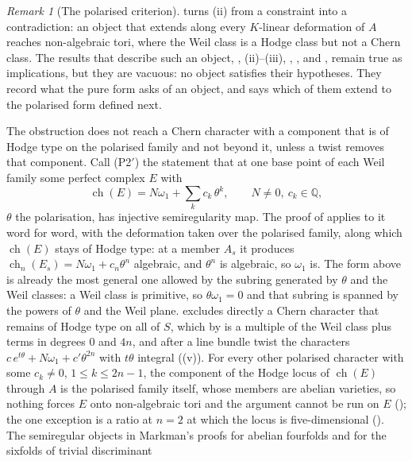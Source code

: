 \documentclass[11pt,reqno]{amsart}
\theoremstyle{plain}
\theoremstyle{definition}
\theoremstyle{remark}
\newtheorem{remark}[theorem]{Remark}
\newcommand{\QQ}{\mathbb{Q}}
\DeclareMathOperator{\ch}{ch}
\begin{document}
\begin{remark}[The polarised criterion]\label{rem:p2prime}
 turns (ii) from a constraint into a
contradiction: an object that extends along every $K$-linear deformation of
$A$ reaches non-algebraic tori, where the Weil class is a Hodge class but not
a Chern class. The results that describe such an object,
, (ii)--(iii), ,
, \cite[Theorem~2.32]{paperIII} and , remain true as
implications, but they are vacuous: no object satisfies their hypotheses.
They record what the pure form asks of an object, and
 says which of them extend to the polarised form
defined next.

The obstruction does not reach a Chern character with a component that is of
Hodge type on the polarised family and not beyond it, unless a twist removes
that component. Call
\textup{(P2$'$)} the statement that at one base point of each Weil family
some perfect complex $E$ with
\[
  \ch(E)=N\omega_{1}+\sum_{k}c_{k}\,\theta^{k},\qquad N\ne0,\ c_{k}\in\QQ,
\]
$\theta$ the polarisation, has injective semiregularity map. The proof of
 applies to it word for word, with the deformation
taken over the polarised family, along which $\ch(E)$ stays of Hodge type:
at a member $A_{s}$ it produces $\ch_{n}(E_{s})=N\omega_{1}+c_{n}\theta^{n}$
algebraic, and $\theta^{n}$ is algebraic, so $\omega_{1}$ is. The form above
is already the most general one allowed by the subring generated by $\theta$
and the Weil classes: a Weil class is primitive, so $\theta\omega_{1}=0$ and
that subring is spanned by the powers of $\theta$ and the Weil plane.
 excludes directly a Chern character that remains of Hodge
type on all of $S$, which by  is a multiple of the
Weil class plus terms in degrees $0$ and $4n$, and after a line bundle twist
the characters $c\,e^{t\theta}+N\omega_{1}+c'\theta^{2n}$ with $t\theta$
integral ((v)). For every other polarised character
with some $c_{k}\ne0$, $1\le k\le2n-1$, the component of the Hodge locus of
$\ch(E)$ through $A$ is the polarised family itself, whose members are
abelian varieties, so nothing forces $E$ onto non-algebraic tori and the
argument cannot be run on $E$ (); the one exception is
a ratio at $n=2$ at which the locus is five-dimensional
(). The semiregular objects in Markman's
proofs for abelian fourfolds and for the sixfolds of trivial discriminant

\end{remark}
\end{document}
